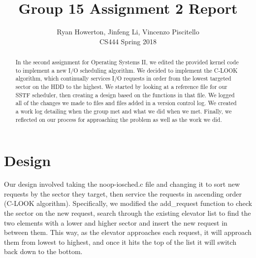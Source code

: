 \documentclass[10pt,draftclsnofoot,onecolumn]{IEEEtran}
\title{Group 15 Assignment 2 Report \vspace{\baselineskip}}
\author{Ryan Howerton, Jinfeng Li, Vincenzo Piscitello \\
		CS444 Spring 2018 \vspace{10\baselineskip}}
\begin{document}
	\maketitle
    \begin{abstract}
  	In the second assignment for Operating Systems II, we edited the provided kernel code to implement a new 
    I/O scheduling algorithm. We decided to implement the C-LOOK algorithm, which continually services I/O 
    requests in order from the lowest targeted sector on the HDD to the highest. We started by looking at a 
    reference file for our SSTF scheduler, then creating a design based on the functions in that file. We logged 
    all of the changes we made to files and files added in a version control log. We created a work log 
    detailing when the group met and what we did when we met. Finally, we reflected on our process for 
    approaching the problem as well as the work we did.
  	\end{abstract}
    
    \newpage
    \section{Design}
    	Our design involved taking the noop-iosched.c file and changing it to sort new requests by the sector 
        they target, then service the requests in ascending order (C-LOOK algorithm). Specifically, we modified 
        the add\_request function to check the sector on the new request, search through the existing elevator 
        list to find the two elements with a lower and higher sector and insert the new request in between them.
        This way, as the elevator approaches each request, it will approach them from lowest to highest, and 
        once it hits the top of the list it will switch back down to the bottom.
\end{document}
